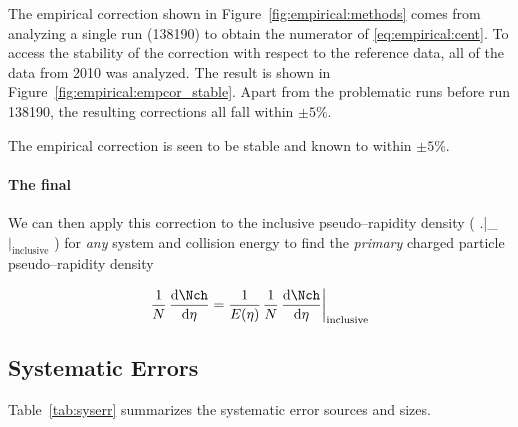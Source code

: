 \documentclass[compat,11pt]{alicenote}
\newcommand*\EmpCor[1][]{\ensuremath E\ifx|#1|\relax\else_{#1}\fi(\eta)}
\newcommand{\tabref}[1]{Table~\ref{#1}}
\newcommand{\figref}[1]{Figure~\ref{#1}}
\newcommand{\indndeta}[1][]{{%
  \ifmmode%
    \left.\ndndeta\right|_{\text{inclusive#1}}%
  \else%
    \ndndeta$|_{\text{inclusive#1}}$%
  \fi}}
\begin{document}
The empirical correction shown in \figref{fig:empirical:methods} comes
from analyzing a single run (138190) to obtain the numerator of
\eqref{eq:empirical:cent}.  To access the stability of the correction
with respect to the reference data, all of the \PbPbCol{} data from
2010 was analyzed.  The result is shown in
\figref{fig:empirical:empcor_stable}.  Apart from the problematic runs
before run 138190, the resulting corrections all fall within $\pm5\%$.

The empirical correction is seen to be stable and known to within
$\pm5\%$.  


\paragraph{The final \ndndeta{}}
We can then apply this correction to the inclusive pseudo--rapidity
density (\indndeta{}) for \emph{any} system and collision energy to
find the \emph{primary} charged particle pseudo--rapidity density

\begin{equation}
  \label{eq:empirical:applied}
  \ndndeta = \frac{1}{\EmpCor{}} \indndeta{}
\end{equation}

\subsection{Systematic Errors}
\label{sec:sub:dndeta:syserr}

\tabref{tab:syserr} summarizes the systematic error sources and
sizes. 
\end{document}
